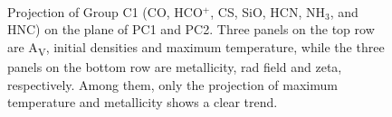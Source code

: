 \documentclass{aa}
\begin{document}
\begin{CJK*}{UTF8}{gbsn}
\begin{figure}[htbp]
{} \\
\caption{Projection of Group C1 (CO, HCO$^+$, CS, SiO, HCN, NH$_3$, and HNC) on the plane of PC1 and PC2. Three panels on the top row are A\textsubscript{V}, initial densities and maximum temperature, while the three panels on the bottom row are metallicity, rad field and zeta, respectively. Among them, only the projection of maximum temperature and metallicity shows a clear trend.}
\label{C1-12}
 \end{figure}
 \begin{figure}[htbp]
\centering

\end{figure}
\end{CJK*}
\end{document}
